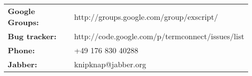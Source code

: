 \begin{tabular}{ll}
{\bf Google Groups:} & http://groups.google.com/group/exscript/ \\
{\bf Bug tracker:}   & http://code.google.com/p/termconnect/issues/list \\
{\bf Phone:}         & +49 176 830 40288 \\
{\bf Jabber:}        & knipknap@jabber.org
\end{tabular}
